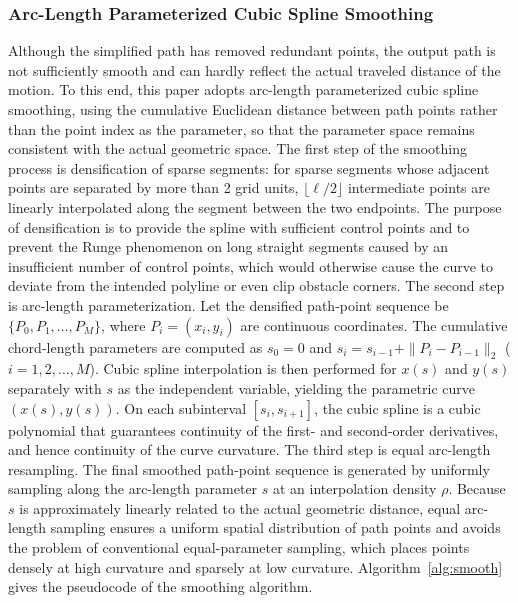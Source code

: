 \subsubsection{Arc-Length Parameterized Cubic Spline Smoothing}

Although the simplified path has removed redundant points, the output path is not sufficiently smooth and can hardly reflect the actual traveled distance of the motion. To this end, this paper adopts arc-length parameterized cubic spline smoothing, using the cumulative Euclidean distance between path points rather than the point index as the parameter, so that the parameter space remains consistent with the actual geometric space. The first step of the smoothing process is densification of sparse segments: for sparse segments whose adjacent points are separated by more than 2 grid units, $\lfloor \ell / 2 \rfloor$ intermediate points are linearly interpolated along the segment between the two endpoints. The purpose of densification is to provide the spline with sufficient control points and to prevent the Runge phenomenon on long straight segments caused by an insufficient number of control points, which would otherwise cause the curve to deviate from the intended polyline or even clip obstacle corners. The second step is arc-length parameterization. Let the densified path-point sequence be $\{P_0, P_1, \ldots, P_M\}$, where $P_i = (x_i, y_i)$ are continuous coordinates. The cumulative chord-length parameters are computed as $s_0 = 0$ and $s_i = s_{i-1} + \|P_i - P_{i-1}\|_2$ ($i = 1, 2, \ldots, M$). Cubic spline interpolation is then performed for $x(s)$ and $y(s)$ separately with $s$ as the independent variable, yielding the parametric curve $(x(s), y(s))$. On each subinterval $[s_i, s_{i+1}]$, the cubic spline is a cubic polynomial that guarantees continuity of the first- and second-order derivatives, and hence continuity of the curve curvature. The third step is equal arc-length resampling. The final smoothed path-point sequence is generated by uniformly sampling along the arc-length parameter $s$ at an interpolation density $\rho$. Because $s$ is approximately linearly related to the actual geometric distance, equal arc-length sampling ensures a uniform spatial distribution of path points and avoids the problem of conventional equal-parameter sampling, which places points densely at high curvature and sparsely at low curvature. Algorithm~\textcolor{blue}{\ref{alg:smooth}} gives the pseudocode of the smoothing algorithm.

